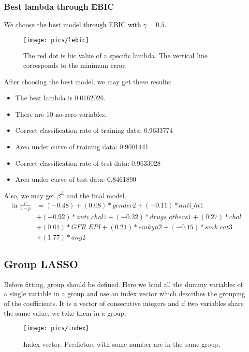 \documentclass[]{article}
\begin{document}
\subsubsection{Best lambda through EBIC}
We choose the best model through EBIC with $ \gamma=0.5 $.

\begin{figure}[H]
	\centering
	\texttt{[image: pics/lebic]}
	\caption{The red dot is bic value of a specific lambda. The vertical line corresponds to the minimum error.\label{fig=lebic}}
\end{figure}

After choosing the best model, we may get these results:
\begin{itemize}
	\item The best lambda is 0.0162026.
	\item There are 10 no-zero variables.
	\item Correct classification rate of training data: 0.9633774
	\item Area under curve of training data: 0.9001441
	\item Correct classification rate of test data: 0.9633028
	\item Area under curve of test data: 0.8461890
\end{itemize}

Also, we may get $ \beta^L $ and the final model.
\begin{align*}
\ln\frac{p}{1-p}&=(-0.48) + ( 0.08)*gender2 + (-0.11)*anti\_ht1\\ &+
(-0.92)*anti\_chol1 + (-0.32)*drugs\_others1 + ( 0.27)*chol \\ &+
 ( 0.01)*GFR\_EPI + ( 0.21)*smkyn2 + (-0.15)*smk\_cat3  \\&+  
( 1.77)*ang2 
\end{align*}


\subsection{Group LASSO}
Before fitting, group should be defined. Here we bind all the dummy variables of a single variable in a group and use an index vector which describes the grouping of the coefficients. It is a vector of consecutive integers and if two variables share the same value, we take them in a group.
\begin{figure}[H]
	\centering
	\texttt{[image: pics/index]}
	\caption{Index vector. Predictors with same number are in the same group.\label{fig=index}}
\end{figure}
\end{document}
